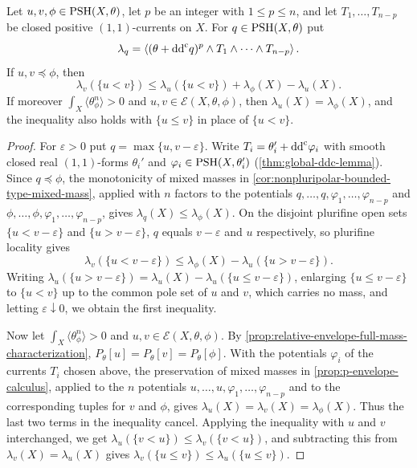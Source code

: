 \begin{proposition}\label{prop:relative-mixed-comparison}
Let $u,v,\phi\in\mathrm{PSH}(X,\theta)$, let $p$ be an integer with $1\leq p\leq n$, and let $T_1,\ldots,T_{n-p}$ be closed positive $(1,1)$-currents on $X$. For $q\in\mathrm{PSH}(X,\theta)$ put
\[
 \lambda_q=\left\langle(\theta+\mathrm{dd}^{\mathrm{c}} q)^p
                           \wedge T_1\wedge\cdots\wedge T_{n-p}\right\rangle.
\]
If $u,v\preceq\phi$, then
\[
 \lambda_v(\{u<v\})\leq\lambda_u(\{u<v\})
                                +\lambda_\phi(X)-\lambda_u(X).
\]
If moreover $\int_X\langle\theta_\phi^n\rangle>0$ and $u,v\in\mathcal E(X,\theta,\phi)$, then $\lambda_u(X)=\lambda_\phi(X)$, and the inequality also holds with $\{u\leq v\}$ in place of $\{u<v\}$.
\end{proposition}
\begin{proof}
For $\varepsilon>0$ put $q=\max\{u,v-\varepsilon\}$. Write $T_i=\theta_i'+\mathrm{dd}^{\mathrm{c}}\varphi_i$ with smooth closed real $(1,1)$-forms $\theta_i'$ and $\varphi_i\in\mathrm{PSH}(X,\theta_i')$ (\cref{thm:global-ddc-lemma}). Since $q\preceq\phi$, the monotonicity of mixed masses in \cref{cor:nonpluripolar-bounded-type-mixed-mass}, applied with $n$ factors to the potentials $q,\ldots,q,\varphi_1,\ldots,\varphi_{n-p}$ and $\phi,\ldots,\phi,\varphi_1,\ldots,\varphi_{n-p}$, gives $\lambda_q(X)\leq\lambda_\phi(X)$. On the disjoint plurifine open sets $\{u<v-\varepsilon\}$ and $\{u>v-\varepsilon\}$, $q$ equals $v-\varepsilon$ and $u$ respectively, so plurifine locality gives
\[
 \lambda_v(\{u<v-\varepsilon\})
            \leq\lambda_\phi(X)-\lambda_u(\{u>v-\varepsilon\}).
\]
Writing $\lambda_u(\{u>v-\varepsilon\})=\lambda_u(X)-\lambda_u(\{u\leq v-\varepsilon\})$, enlarging $\{u\leq v-\varepsilon\}$ to $\{u<v\}$ up to the common pole set of $u$ and $v$, which carries no mass, and letting $\varepsilon\downarrow0$, we obtain the first inequality.

Now let $\int_X\langle\theta_\phi^n\rangle>0$ and $u,v\in\mathcal E(X,\theta,\phi)$. By \cref{prop:relative-envelope-full-mass-characterization}, $P_\theta[u]=P_\theta[v]=P_\theta[\phi]$. With the potentials $\varphi_i$ of the currents $T_i$ chosen above, the preservation of mixed masses in \cref{prop:p-envelope-calculus}, applied to the $n$ potentials $u,\ldots,u,\varphi_1,\ldots,\varphi_{n-p}$ and to the corresponding tuples for $v$ and $\phi$, gives $\lambda_u(X)=\lambda_v(X)=\lambda_\phi(X)$. Thus the last two terms in the inequality cancel. Applying the inequality with $u$ and $v$ interchanged, we get $\lambda_u(\{v<u\})\leq\lambda_v(\{v<u\})$, and subtracting this from $\lambda_v(X)=\lambda_u(X)$ gives $\lambda_v(\{u\leq v\})\leq\lambda_u(\{u\leq v\})$.
\end{proof}

